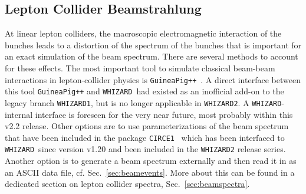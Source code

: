\documentclass[12pt]{book}
\newcommand{\ttt}[1]{\texttt{#1}}
\newcommand{\whizard}{\ttt{WHIZARD}}
\newcommand{\circeone}{\ttt{CIRCE1}}
\begin{document}

\subsection{Lepton Collider Beamstrahlung}
\label{sec:beamstrahlung}

At linear lepton colliders, the macroscopic electromagnetic
interaction of the bunches leads to a distortion of the spectrum of
the bunches that is important for an exact simulation of the beam
spectrum. There are several methods to account for these effects. The
most important tool to simulate classical beam-beam interactions in
lepton-collider physics is
\ttt{GuineaPig++}~\cite{Schulte:1998au,Schulte:1999tx,Schulte:2007zz}. A
direct interface between this tool \ttt{GuineaPig++} and \whizard\ had
existed as an inofficial add-on to the legacy branch \whizard\ttt{1},
but is no longer applicable in \whizard\ttt{2}. A \whizard-internal
interface is foreseen for the very near future, most probably within
this v2.2 release. Other options are to use parameterizations of the
beam spectrum that have been included in the package \circeone~\cite{CIRCE}
which has been interfaced to \whizard\ since version v1.20 and been
included in the \whizard\ttt{2} release series. Another option is to
generate a beam spectrum externally and then read it in as an ASCII
data file, cf. Sec.~\ref{sec:beamevents}. More about this can be found
in a dedicated section on lepton collider spectra,
Sec.~\ref{sec:beamspectra}.
\end{document}
